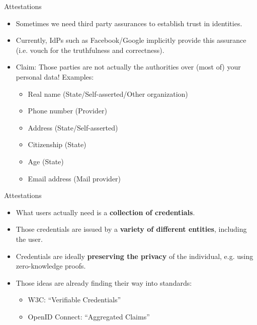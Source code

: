 \documentclass[aspectratio=169]{beamer}
\let\oldemph\textbf
\renewcommand{\textbf}[1]{{\color{mLightBrown}\oldemph{#1}}}
\begin{document}
\begin{frame}{Attestations}
  \centering
  \begin{itemize}
    \item Sometimes we need third party assurances to establish trust in identities.
      \pause
    \item Currently, IdPs such as Facebook/Google implicitly provide this assurance (i.e. vouch for the truthfulness and correctness).
      \pause
    \item Claim: Those parties are not actually the authorities over (most of) your personal data! Examples:
      \begin{itemize}
        \item Real name (State/Self-asserted/Other organization)
        \item Phone number (Provider)
        \item Address (State/Self-asserted)
        \item Citizenship (State)
        \item Age (State)
        \item Email address (Mail provider)
      \end{itemize}
  \end{itemize}
\end{frame}

\begin{frame}{Attestations}
  \centering
  \begin{itemize}
    \item What users actually need is a \textbf{collection of credentials}.
      \pause
    \item Those credentials are issued by a \textbf{variety of different entities}, including the user.
      \pause
    \item Credentials are ideally \textbf{preserving the privacy} of the individual, e.g. using zero-knowledge proofs.
      \pause
    \item Those ideas are already finding their way into standards:
      \begin{itemize}
        \item W3C: ``Verifiable Credentials''
        \item OpenID Connect: ``Aggregated Claims'' \uncover<5->{$\Leftarrow$ \textbf{working on it}.}
      \end{itemize}
  \end{itemize}
\end{frame}
\end{document}
